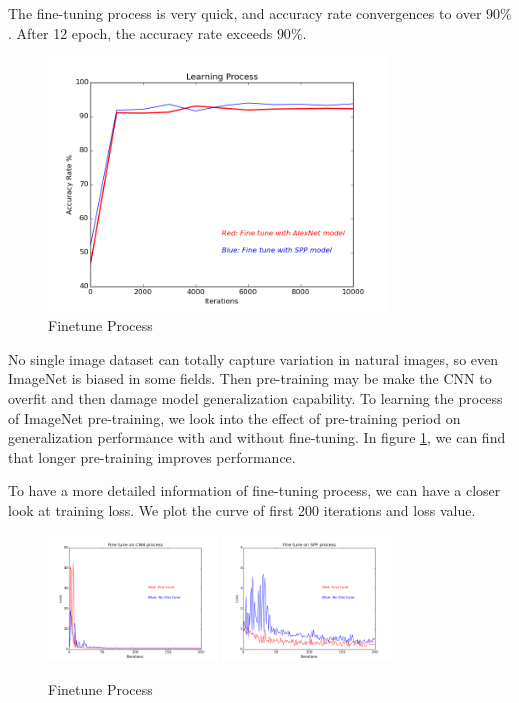 The fine-tuning process is very quick, and accuracy rate convergences to over $90\%$. 
After 12 epoch, the accuracy rate exceeds $90\%$. 
\graphicspath{ {./Figures/} }
\begin{figure}[!htb]
    \centering
	\includegraphics[width=0.8\textwidth]{FinetuneAccuracy.png}
    \caption{Finetune Process}%
    \label{fig:finetuneprocess}%
\end{figure}

No single image dataset can totally capture variation in natural images, so even ImageNet is biased in some fields. Then pre-training may be make the CNN to overfit and then damage model generalization capability. To learning the process of ImageNet pre-training, we look into the effect of pre-training period on generalization performance with and without fine-tuning. In figure \ref{fig:finetuneprocess}, we can find that longer pre-training improves performance.

To have a more detailed information of fine-tuning process, we can have a closer look at training loss. We plot the curve of first 200 iterations and loss value.

\begin{figure}[!htb]
    \centering
	\includegraphics[width=0.4\textwidth]{finetuneCNNProcess.png}
	\includegraphics[width=0.4\textwidth]{finetuneSPPProcess.png}
    \caption{Finetune Process}%
    \label{fig:FTvsSC}%
\end{figure}

